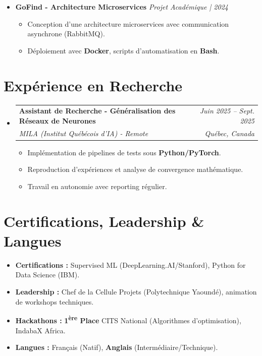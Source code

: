 \documentclass[a4paper,11pt]{article}
\makeatletter
\newcommand{\resumeSubheading}[4]{
  \vspace{-1pt}\item
    \begin{tabular*}{0.97\textwidth}[t]{l@{\extracolsep{\fill}}r}
      \textbf{#1} & \textit{\small #2} \\
      \textit{\small #3} & \textit{\small #4} \\
    \end{tabular*}\vspace{-5pt}
}
\makeatother
\begin{document}
\begin{itemize}[leftmargin=*, label={-}]
\item \textbf{GoFind - Architecture Microservices} \hfill \textit{Projet Académique | 2024}
\vspace{-2pt}
\begin{itemize}[leftmargin=0.4cm, nosep, label=\tiny$\bullet$]
    \item \small{Conception d'une architecture microservices avec communication asynchrone (RabbitMQ).}
    \item \small{Déploiement avec \textbf{Docker}, scripts d'automatisation en \textbf{Bash}.}
\end{itemize}

\end{itemize}

\section{Expérience en Recherche}
\begin{itemize}[leftmargin=*, label={-}]

    \resumeSubheading
      {Assistant de Recherche - Généralisation des Réseaux de Neurones}{Juin 2025 -- Sept. 2025}
      {MILA (Institut Québécois d'IA) - Remote}{Québec, Canada}
      \begin{itemize}[leftmargin=0.4cm, nosep, label=\tiny$\bullet$]
        \item \small{Implémentation de pipelines de tests sous \textbf{Python/PyTorch}.}
        \item \small{Reproduction d'expériences et analyse de convergence mathématique.}
        \item \small{Travail en autonomie avec reporting régulier.}
      \end{itemize}

\end{itemize}

\section{Certifications, Leadership \& Langues}
\begin{itemize}[leftmargin=*, nosep]
    \item \textbf{Certifications :} Supervised ML (DeepLearning.AI/Stanford), Python for Data Science (IBM).
    \item \textbf{Leadership :} Chef de la Cellule Projets (Polytechnique Yaoundé), animation de workshops techniques.
    \item \textbf{Hackathons :} \textbf{1\textsuperscript{ère} Place} CITS National (Algorithmes d'optimisation), IndabaX Africa.
    \item \textbf{Langues :} Français (Natif), \textbf{Anglais} (Intermédiaire/Technique).
\end{itemize}
\end{document}
